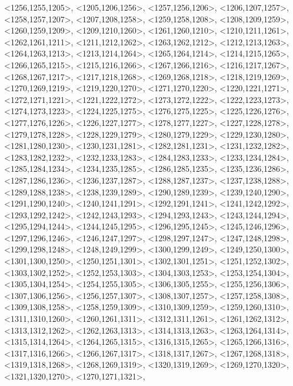 \documentclass[a4paper,10pt]{article}
\begin{document}
\begin{eulernotebook}
\begin{euleroutput}
  <1256,1255,1205>,
  <1205,1206,1256>,
  <1257,1256,1206>,
  <1206,1207,1257>,
  <1258,1257,1207>,
  <1207,1208,1258>,
  <1259,1258,1208>,
  <1208,1209,1259>,
  <1260,1259,1209>,
  <1209,1210,1260>,
  <1261,1260,1210>,
  <1210,1211,1261>,
  <1262,1261,1211>,
  <1211,1212,1262>,
  <1263,1262,1212>,
  <1212,1213,1263>,
  <1264,1263,1213>,
  <1213,1214,1264>,
  <1265,1264,1214>,
  <1214,1215,1265>,
  <1266,1265,1215>,
  <1215,1216,1266>,
  <1267,1266,1216>,
  <1216,1217,1267>,
  <1268,1267,1217>,
  <1217,1218,1268>,
  <1269,1268,1218>,
  <1218,1219,1269>,
  <1270,1269,1219>,
  <1219,1220,1270>,
  <1271,1270,1220>,
  <1220,1221,1271>,
  <1272,1271,1221>,
  <1221,1222,1272>,
  <1273,1272,1222>,
  <1222,1223,1273>,
  <1274,1273,1223>,
  <1224,1225,1275>,
  <1276,1275,1225>,
  <1225,1226,1276>,
  <1277,1276,1226>,
  <1226,1227,1277>,
  <1278,1277,1227>,
  <1227,1228,1278>,
  <1279,1278,1228>,
  <1228,1229,1279>,
  <1280,1279,1229>,
  <1229,1230,1280>,
  <1281,1280,1230>,
  <1230,1231,1281>,
  <1282,1281,1231>,
  <1231,1232,1282>,
  <1283,1282,1232>,
  <1232,1233,1283>,
  <1284,1283,1233>,
  <1233,1234,1284>,
  <1285,1284,1234>,
  <1234,1235,1285>,
  <1286,1285,1235>,
  <1235,1236,1286>,
  <1287,1286,1236>,
  <1236,1237,1287>,
  <1288,1287,1237>,
  <1237,1238,1288>,
  <1289,1288,1238>,
  <1238,1239,1289>,
  <1290,1289,1239>,
  <1239,1240,1290>,
  <1291,1290,1240>,
  <1240,1241,1291>,
  <1292,1291,1241>,
  <1241,1242,1292>,
  <1293,1292,1242>,
  <1242,1243,1293>,
  <1294,1293,1243>,
  <1243,1244,1294>,
  <1295,1294,1244>,
  <1244,1245,1295>,
  <1296,1295,1245>,
  <1245,1246,1296>,
  <1297,1296,1246>,
  <1246,1247,1297>,
  <1298,1297,1247>,
  <1247,1248,1298>,
  <1299,1298,1248>,
  <1248,1249,1299>,
  <1300,1299,1249>,
  <1249,1250,1300>,
  <1301,1300,1250>,
  <1250,1251,1301>,
  <1302,1301,1251>,
  <1251,1252,1302>,
  <1303,1302,1252>,
  <1252,1253,1303>,
  <1304,1303,1253>,
  <1253,1254,1304>,
  <1305,1304,1254>,
  <1254,1255,1305>,
  <1306,1305,1255>,
  <1255,1256,1306>,
  <1307,1306,1256>,
  <1256,1257,1307>,
  <1308,1307,1257>,
  <1257,1258,1308>,
  <1309,1308,1258>,
  <1258,1259,1309>,
  <1310,1309,1259>,
  <1259,1260,1310>,
  <1311,1310,1260>,
  <1260,1261,1311>,
  <1312,1311,1261>,
  <1261,1262,1312>,
  <1313,1312,1262>,
  <1262,1263,1313>,
  <1314,1313,1263>,
  <1263,1264,1314>,
  <1315,1314,1264>,
  <1264,1265,1315>,
  <1316,1315,1265>,
  <1265,1266,1316>,
  <1317,1316,1266>,
  <1266,1267,1317>,
  <1318,1317,1267>,
  <1267,1268,1318>,
  <1319,1318,1268>,
  <1268,1269,1319>,
  <1320,1319,1269>,
  <1269,1270,1320>,
  <1321,1320,1270>,
  <1270,1271,1321>,

\end{euleroutput}
\end{eulernotebook}
\end{document}
